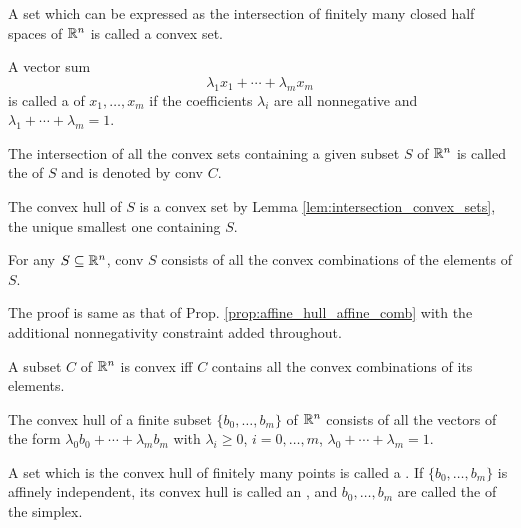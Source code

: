 \documentclass[11pt,a4paper]{article}
\begin{document}
\begin{definition}
    A set which can be expressed as the intersection of finitely many closed half spaces of $\mathbb{R}^n$ is called a  convex set.
\end{definition}

\begin{definition}
    A vector sum
    \begin{equation*}
        \lambda_1 x_1+\cdots + \lambda_m x_m
    \end{equation*}
    is called a  of $x_1,\ldots,x_m$ if the coefficients $\lambda_i$ are all nonnegative and $\lambda_1+\cdots+\lambda_m = 1$.
\end{definition}

\begin{definition}
    The intersection of all the convex sets containing a given subset $S$ of $\mathbb{R}^n$ is called the  of $S$ and is denoted by conv $C$. 
\end{definition}

\begin{remark}
    The convex hull of $S$ is a convex set by Lemma \ref{lem:intersection_convex_sets}, the unique smallest one containing $S$.
\end{remark}

\begin{theorem}\label{thm:convex_hull_convex_combinations}
    For any $S\subseteq \mathbb{R}^n$, conv $S$ consists of all the convex combinations of the elements of $S$.
\end{theorem}

The proof is same as that of Prop. \ref{prop:affine_hull_affine_comb} with the additional nonnegativity constraint added throughout.

\begin{corollary}
    A subset $C$ of $\mathbb{R}^n$ is convex iff $C$ contains all the convex combinations of its elements.
\end{corollary}

\begin{corollary}
    The convex hull of a finite subset $\{b_0,\ldots, b_m\}$ of $\mathbb{R}^n$ consists of all the vectors of the form $\lambda_0 b_0 + \cdots +\lambda_m b_m$ with $\lambda_i \ge 0$, $i = 0,\ldots, m$, $\lambda_0+\cdots + \lambda_m = 1$.
\end{corollary}

\begin{definition}
    A set which is the convex hull of finitely many points is called a . If $\{b_0,\ldots,b_m\}$ is affinely independent, its convex hull is called an , and $b_0,\ldots,b_m$ are called the  of the simplex.
\end{definition}
\end{document}
